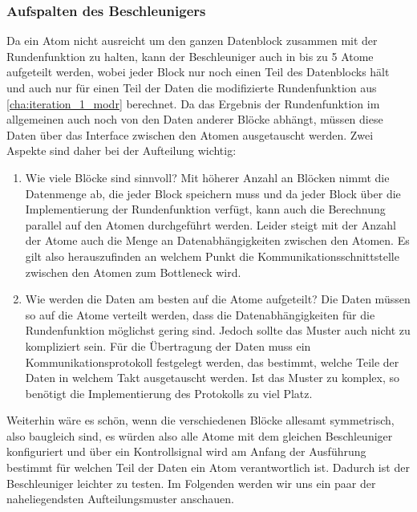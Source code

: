 \subsubsection{Aufspalten des Beschleunigers}
Da ein Atom nicht ausreicht um den ganzen Datenblock zusammen mit der Rundenfunktion zu halten, kann der Beschleuniger auch in bis zu 5 Atome aufgeteilt werden,
wobei jeder Block nur noch einen Teil des Datenblocks hält und auch nur für einen Teil der Daten die modifizierte Rundenfunktion aus \ref{cha:iteration_1_modr} berechnet.
Da das Ergebnis der Rundenfunktion im allgemeinen auch noch von den Daten anderer Blöcke abhängt, müssen diese Daten über das Interface zwischen den Atomen ausgetauscht werden.
Zwei Aspekte sind daher bei der Aufteilung wichtig:
\begin{enumerate}
    \item Wie viele Blöcke sind sinnvoll? Mit höherer Anzahl an Blöcken nimmt die Datenmenge ab, die jeder Block speichern muss und da jeder Block über die Implementierung der Rundenfunktion
    verfügt, kann auch die Berechnung parallel auf den Atomen durchgeführt werden. Leider steigt mit der Anzahl der Atome auch die Menge an Datenabhängigkeiten zwischen den Atomen.
    Es gilt also herauszufinden an welchem Punkt die Kommunikationsschnittstelle zwischen den Atomen zum Bottleneck wird.
    \item Wie werden die Daten am besten auf die Atome aufgeteilt? Die Daten müssen so auf die Atome verteilt werden, dass die Datenabhängigkeiten für die Rundenfunktion möglichst gering sind.
    Jedoch sollte das Muster auch nicht zu kompliziert sein. Für die Übertragung der Daten muss ein Kommunikationsprotokoll festgelegt werden, das bestimmt,
    welche Teile der Daten in welchem Takt ausgetauscht werden. Ist das Muster zu komplex, so benötigt die Implementierung des Protokolls zu viel Platz.
\end{enumerate}
Weiterhin wäre es schön, wenn die verschiedenen Blöcke allesamt symmetrisch, also baugleich sind, es würden also alle Atome mit dem gleichen Beschleuniger konfiguriert
und über ein Kontrollsignal wird am Anfang der Ausführung bestimmt für welchen Teil der Daten ein Atom verantwortlich ist.
Dadurch ist der Beschleuniger leichter zu testen. Im Folgenden werden wir uns ein paar der naheliegendsten Aufteilungsmuster anschauen.

